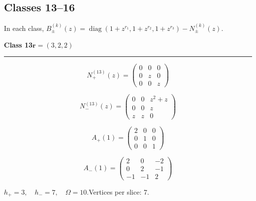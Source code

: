 \subsection*{Classes 13--16}
\noindent In each class, $B_\pm^{(k)}(z)=\operatorname{diag}(1+z^{r_1},1+z^{r_2},1+z^{r_3})-N_\pm^{(k)}(z)$.\par\medskip
\noindent\begin{minipage}{\linewidth}
\noindent\textbf{Class 13}\hfill $\symbf{r}=(3,2,2)$
\par\smallskip\noindent\textcolor{rulegray}{\rule{\linewidth}{0.3pt}}
\begin{minipage}[c]{0.495\linewidth}\centering\fontsize{10.5}{13}\selectfont
\setlength{\abovedisplayskip}{3pt}\setlength{\belowdisplayskip}{3pt}
\setlength{\abovedisplayshortskip}{3pt}\setlength{\belowdisplayshortskip}{3pt}
\setlength{\arraycolsep}{3.5pt}\renewcommand{\arraystretch}{1.18}
\[N_{+}^{(13)}(z)=\begin{pmatrix}0 & 0 & 0\\0 & z & 0\\0 & 0 & z\end{pmatrix}\]
\end{minipage}%
\begin{minipage}[c]{0.495\linewidth}\centering\fontsize{10.5}{13}\selectfont
\setlength{\abovedisplayskip}{3pt}\setlength{\belowdisplayskip}{3pt}
\setlength{\abovedisplayshortskip}{3pt}\setlength{\belowdisplayshortskip}{3pt}
\setlength{\arraycolsep}{3.5pt}\renewcommand{\arraystretch}{1.18}
\[N_{-}^{(13)}(z)=\begin{pmatrix}0 & 0 & z^{2} + z\\0 & 0 & z\\z & z & 0\end{pmatrix}\]
\end{minipage}%
\par\noindent
\begin{minipage}[c]{0.495\linewidth}\centering\fontsize{10.5}{13}\selectfont
\setlength{\abovedisplayskip}{3pt}\setlength{\belowdisplayskip}{3pt}
\setlength{\abovedisplayshortskip}{3pt}\setlength{\belowdisplayshortskip}{3pt}
\setlength{\arraycolsep}{3.5pt}\renewcommand{\arraystretch}{1.18}
\[A_{+}(1)=\begin{pmatrix}2 & 0 & 0\\0 & 1 & 0\\0 & 0 & 1\end{pmatrix}\]
\end{minipage}%
\begin{minipage}[c]{0.495\linewidth}\centering\fontsize{10.5}{13}\selectfont
\setlength{\abovedisplayskip}{3pt}\setlength{\belowdisplayskip}{3pt}
\setlength{\abovedisplayshortskip}{3pt}\setlength{\belowdisplayshortskip}{3pt}
\setlength{\arraycolsep}{3.5pt}\renewcommand{\arraystretch}{1.18}
\[A_{-}(1)=\begin{pmatrix}2 & 0 & -2\\0 & 2 & -1\\-1 & -1 & 2\end{pmatrix}\]
\end{minipage}%
\par\smallskip\noindent\small $h_+=3,\quad h_-=7,\quad \Omega=10.$\quad Vertices per slice: 7.
\end{minipage}\par\vfill

